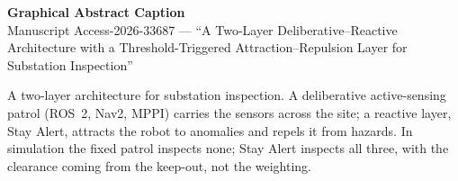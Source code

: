 \documentclass[11pt]{article}
\begin{document}
\begin{center}
{\large\bfseries Graphical Abstract Caption}\\[2pt]
{\small Manuscript Access-2026-33687 ---
``A Two-Layer Deliberative--Reactive Architecture with a Threshold-Triggered
Attraction--Repulsion Layer for Substation Inspection''}
\end{center}
\vspace{1em}
\noindent
A two-layer architecture for substation inspection. A deliberative
active-sensing patrol (ROS~2, Nav2, MPPI) carries the sensors across the site;
a reactive layer, Stay Alert, attracts the robot to anomalies and
repels it from hazards. In simulation the fixed patrol inspects none;
Stay Alert inspects all three, with the clearance coming from the
keep-out, not the weighting.
\vspace{1em}

\end{document}
